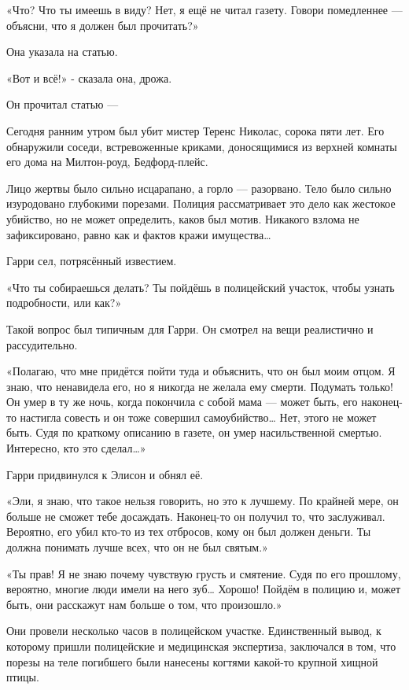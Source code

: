 \documentclass[a4paper,12pt]{book}
\begin{document}
«Что? Что ты имеешь в виду? Нет, я ещё не читал газету. Говори помедленнее — объясни, что я должен был прочитать?»
\par
Она указала на статью.
\par
«Вот и всё!» - сказала она, дрожа.
\par
Он прочитал статью —\\
\par
Сегодня ранним утром был убит мистер Теренс Николас, сорока пяти лет. Его обнаружили соседи, встревоженные криками, доносящимися из верхней комнаты его дома на Милтон-роуд, Бедфорд-плейс.
\par
	Лицо жертвы было сильно исцарапано, а горло — разорвано. Тело было сильно изуродовано глубокими порезами. Полиция рассматривает это дело как жестокое убийство, но не может определить, каков был мотив. Никакого взлома не зафиксировано, равно как и фактов кражи имущества…\\
\par
Гарри сел, потрясённый известием.
\par
«Что ты собираешься делать? Ты пойдёшь в полицейский участок, чтобы узнать подробности, или как?»
\par
Такой вопрос был типичным для Гарри. Он смотрел на вещи реалистично и рассудительно.
\par
«Полагаю, что мне придётся пойти туда и объяснить, что он был моим отцом. Я знаю, что ненавидела его, но я никогда не желала ему смерти. Подумать только! Он умер в ту же ночь, когда покончила с собой мама — может быть, его наконец-то настигла совесть и он тоже совершил самоубийство… Нет, этого не может быть. Судя по краткому описанию в газете, он умер насильственной смертью. Интересно, кто это сделал…»
\par
Гарри придвинулся к Элисон и обнял её.
\par
«Эли, я знаю, что такое нельзя говорить, но это к лучшему. По крайней мере, он больше не сможет тебе досаждать. Наконец-то он получил то, что заслуживал. Вероятно, его убил кто-то из тех отбросов, кому он был должен деньги. Ты должна понимать лучше всех, что он не был святым.»
\par
«Ты прав! Я не знаю почему чувствую грусть и смятение. Судя по его прошлому, вероятно, многие люди имели на него зуб… Хорошо! Пойдём в полицию и, может быть, они расскажут нам больше о том, что произошло.»
\par
Они провели несколько часов в полицейском участке. Единственный вывод, к которому пришли полицейские и медицинская экспертиза, заключался в том, что порезы на теле погибшего были нанесены когтями какой-то крупной хищной птицы.
\end{document}
